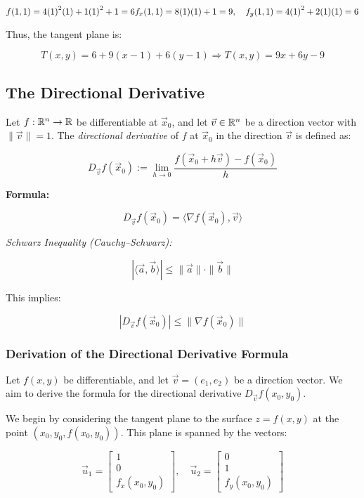 \[
    f(1, 1) = 4{(1)}^2(1) + 1{(1)}^2 + 1 = 6 \\
    f_x(1, 1) = 8(1)(1) + 1 = 9, \quad f_y(1, 1) = 4{(1)}^2 + 2(1)(1) = 6
\]

Thus, the tangent plane is:

\[
    T(x, y) = 6 + 9(x - 1) + 6(y - 1)
    \Rightarrow T(x, y) = 9x + 6y - 9
\]

\subsection{The Directional Derivative}

Let \( f : \mathbb{R}^n \to \mathbb{R} \) be differentiable at \( \vec{x}_0 \), 
and let \( \vec{v} \in \mathbb{R}^n \) be a direction vector with \( \|\vec{v}\| = 1 \). The 
\emph{directional derivative} of \(f\) at \( \vec{x}_0 \) in the direction \( \vec{v} \) is defined as:

\[
    D_{\vec{v}}f(\vec{x}_0) := \lim_{h \to 0} \frac{f(\vec{x}_0 + h\vec{v}) - f(\vec{x}_0)}{h}
\]

\textbf{Formula:}

\[
    D_{\vec{v}}f(\vec{x}_0) = \langle \nabla f(\vec{x}_0), \vec{v} \rangle
\]

\emph{Schwarz Inequality (Cauchy–Schwarz):}

\[
    |\langle \vec{a}, \vec{b} \rangle| \le \|\vec{a}\| \cdot \|\vec{b}\|
\]

This implies:

\[
    |D_{\vec{v}}f(\vec{x}_0)| \le \|\nabla f(\vec{x}_0)\|
\]

\subsubsection{Derivation of the Directional Derivative Formula}

Let \( f(x, y) \) be differentiable, and let \( \vec{v} = (e_1, e_2) \) be a direction vector. We aim to 
derive the formula for the directional derivative \( D_{\vec{v}} f(x_0, y_0) \).

We begin by considering the tangent plane to the surface \( z = f(x, y) \) at the point 
\( (x_0, y_0, f(x_0, y_0)) \). This plane is spanned by the vectors:

\[
    \vec{u}_1 = 
    \begin{bmatrix}
    1 \\
    0 \\
    f_x(x_0, y_0)
    \end{bmatrix}, \quad
    \vec{u}_2 = 
    \begin{bmatrix}
    0 \\
    1 \\
    f_y(x_0, y_0)
    \end{bmatrix}
\]

